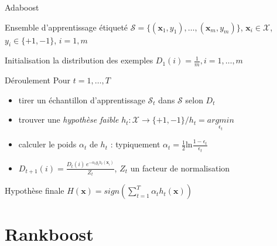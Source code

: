 \documentclass{beamer}
\newcommand{\vs}[1]{\boldsymbol{#1}} %
\begin{document}
\begin{frame}{Adaboost}
    \begin{block}{Ensemble d'apprentissage étiqueté}
        $\mathcal{S} = \{ (\vs{x}_{1},y_{1}),\ldots,(\vs{x}_{m},y_{m}) \}$,
        $\vs{x}_{i} \in \mathcal{X}$, $y_{i} \in \{+1, -1\}$, $i = 1, m$
    \end{block}
    \begin{block}{Initialisation la distribution des exemples}
        $D_1(i) = \frac{1}{m}, i=1,\ldots,m$
    \end{block}
    \begin{block}{Déroulement}
        Pour $t = 1,\ldots,T$
        \begin{itemize}
            \item tirer un échantillon d'apprentissage $\mathcal{S}_t$ dans $\mathcal{S}$ selon $D_t$
            \item trouver une \emph{hypothèse faible} $h_{t} : \mathcal{X} \to \{+1, -1\} /
                  h_t = \underset{\epsilon_t}{argmin} $
            \item calculer le poids $\alpha_{t}$ de $h_t$ :
                  typiquement $\alpha_{t}=\frac{1}{2}\textrm{ln}\frac{1-\epsilon_{t}}{\epsilon_{t}}$ 
            \item $D_{t+1}(i) = \frac{ D_{t}(i) \, e^{- \alpha_{t} y_i h_{t}(\vs{x}_{i})} }{ Z_{t} }$, 
                  $Z_{t}$ un facteur de normalisation
        \end{itemize}
    \end{block}
    \begin{block}{Hypothèse finale}
        $H(\vs{x}) = sign(\sum_{t=1}^{T} \alpha_{t} h_{t}(\vs{x}))$
    \end{block}
\end{frame}


\section{Rankboost}
\end{document}
